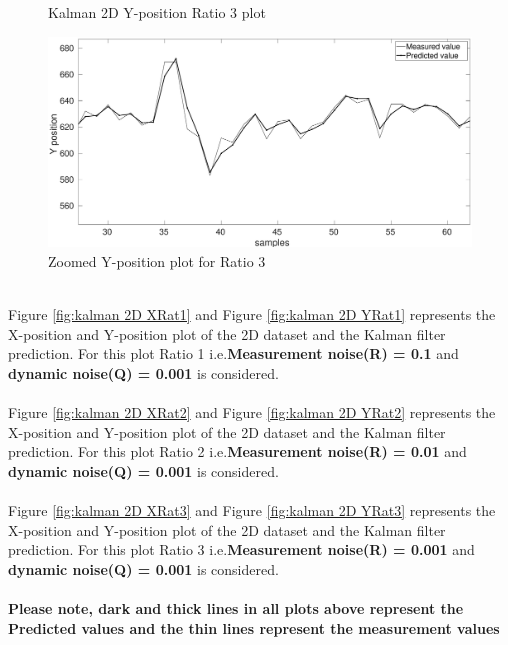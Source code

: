 \documentclass[12pt]{article}
\begin{document}
\begin{figure}[ht!]
\begin{minipage}{0.5\textwidth}
	\caption{Kalman 2D Y-position Ratio 3 plot }
	\label{fig:kalman 2D YRat3}
\end{minipage}%
\begin{minipage}{0.5\textwidth}
\centering
	\includegraphics[width = \textwidth]{./Figures/part2Ratio3Yzoomed.eps}
	\caption{ Zoomed Y-position plot for Ratio 3}
	\label{fig: kalman 2D YRat3 zoom}
\end{minipage}
\end{figure}
\quad \\
\noindent
Figure \ref{fig:kalman 2D XRat1} and Figure \ref{fig:kalman 2D YRat1} represents the X-position and Y-position plot of the 2D dataset and the Kalman filter prediction. For this plot Ratio 1 i.e.\textbf{Measurement noise(R) = 0.1} and \textbf{dynamic noise(Q) = 0.001} is considered.\\
\\
\noindent
Figure \ref{fig:kalman 2D XRat2} and Figure \ref{fig:kalman 2D YRat2} represents the X-position and Y-position plot of the 2D dataset and the Kalman filter prediction. For this plot Ratio 2 i.e.\textbf{Measurement noise(R) = 0.01} and \textbf{dynamic noise(Q) = 0.001} is considered.\\
\\
\noindent
Figure \ref{fig:kalman 2D XRat3} and Figure \ref{fig:kalman 2D YRat3} represents the X-position and Y-position plot of the 2D dataset and the Kalman filter prediction. For this plot Ratio 3 i.e.\textbf{Measurement noise(R) = 0.001} and \textbf{dynamic noise(Q) = 0.001} is considered.\\
\\
\textbf{Please note, dark and thick lines in all plots above represent the Predicted values and the thin lines represent the measurement values}

\newpage
\end{document}
